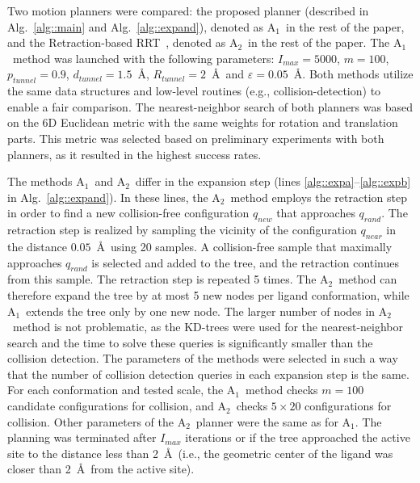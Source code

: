 \documentclass[usletter, 10pt, conference]{ieeeconf} %
\def\qrand{q_{rand}}
\def\qnear{q_{near}}
\def\qnew{q_{new}}
\def\dt{d_{tunnel}}
\def\rv{R_{tunnel}}
\def\Imax{I_{max}} %
\def\gb{p_{tunnel}}
\def\RA{A$_{1}$}
\def\RB{A$_{2}$}
\def\RC{A$_{1}^{*}$}
\begin{document}
Two motion planners were compared: the proposed planner (described in Alg.~\ref{alg::main} and Alg.~\ref{alg::expand}), denoted as \RA\ in the rest of the paper, and the Retraction-based RRT~\cite{zhangRetraction}, denoted as \RB\ in the rest of the paper.
The \RA\ method was launched with the following parameters:
$\Imax=5000$, $m=100$, $\gb=0.9$, $\dt=1.5$~\AA, $\rv=2$~\AA\ and $\varepsilon=0.05$~\AA.
Both methods utilize the same data structures and low-level routines (e.g., collision-detection) to enable a fair comparison.
The nearest-neighbor search of both planners was based on the 6D Euclidean metric with the same weights for rotation and translation parts.
This metric was selected based on preliminary experiments with both planners, as it resulted in the highest success rates.

The methods \RA\ and \RB\ differ in the expansion step (lines \ref{alg::expa}--\ref{alg::expb} in Alg.~\ref{alg::expand}).
In these lines, the \RB\ method employs the retraction step in order to find a new collision-free configuration $\qnew$ that approaches $\qrand$.
The retraction step is realized by sampling the vicinity of the configuration $\qnear$ in the distance $0.05$~\AA\ using 20 samples.
A collision-free sample that maximally approaches $\qrand$ is selected and added to the tree, and the retraction continues from this sample.
The retraction step is repeated 5 times.
The \RB\ method can therefore expand the tree by at most 5 new nodes per ligand conformation, while \RA\ extends the tree only by one new node.
The larger number of nodes in \RB\ method is not problematic, as the KD-trees were used for the nearest-neighbor search and the time to solve these queries is significantly smaller than the collision detection.
The parameters of the methods were selected in such a way that the number of collision detection queries in each expansion step is the same.
For each conformation and tested scale, the \RA\ method checks $m=100$ candidate configurations for collision, and \RB\ checks $5 \times 20$ configurations for collision.
Other parameters of the \RB\ planner were the same as for \RA.
The planning was terminated after $\Imax$ iterations or if the tree approached the active site to the distance less than 2~\AA\ (i.e., the 
geometric center of the ligand was closer than 2~\AA\ from the active site).
\end{document}
